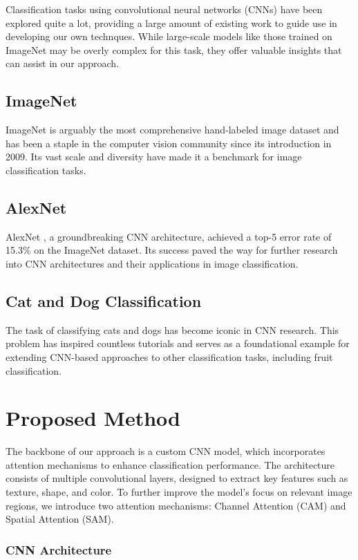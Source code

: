 \documentclass{article}
\begin{document}
Classification tasks using convolutional neural networks (CNNs) have been explored quite a lot, providing a large amount of existing work to guide use in developing our own technques. While large-scale models like those trained on ImageNet may be overly complex for this task, they offer valuable insights that can assist in our approach.

\subsection*{ImageNet}
ImageNet is arguably the most comprehensive hand-labeled image dataset and has been a staple in the computer vision community since its introduction in 2009. Its vast scale and diversity have made it a benchmark for image classification tasks.

\subsection*{AlexNet}
AlexNet \cite{krizhevsky2012imagenet}, a groundbreaking CNN architecture, achieved a top-5 error rate of 15.3\% on the ImageNet dataset. Its success paved the way for further research into CNN architectures and their applications in image classification.

\subsection*{Cat and Dog Classification}
The task of classifying cats and dogs has become iconic in CNN research. This problem has inspired countless tutorials and serves as a foundational example for extending CNN-based approaches to other classification tasks, including fruit classification.


\section{Proposed Method}

The backbone of our approach is a custom CNN model, which incorporates attention mechanisms to enhance classification performance. The architecture consists of multiple convolutional layers, designed to extract key features such as texture, shape, and color. To further improve the model's focus on relevant image regions, we introduce two attention mechanisms: Channel Attention (CAM) and Spatial Attention (SAM).


\subsubsection{CNN Architecture}
\end{document}
